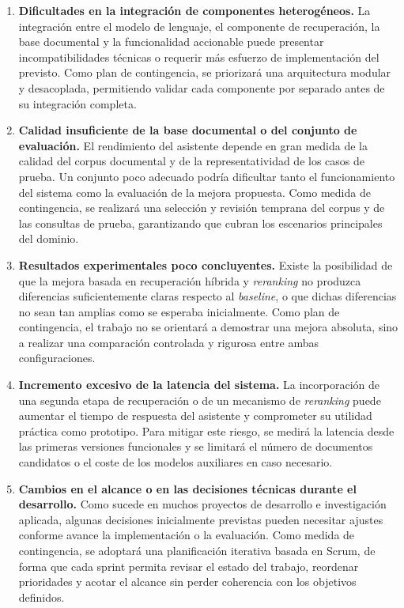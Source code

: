 \begin{enumerate}
    \item \textbf{Dificultades en la integración de componentes heterogéneos.}  
    La integración entre el modelo de lenguaje, el componente de recuperación, la base documental y la funcionalidad accionable puede presentar incompatibilidades técnicas o requerir más esfuerzo de implementación del previsto.  
    Como plan de contingencia, se priorizará una arquitectura modular y desacoplada, permitiendo validar cada componente por separado antes de su integración completa. 

    \item \textbf{Calidad insuficiente de la base documental o del conjunto de evaluación.}  
    El rendimiento del asistente depende en gran medida de la calidad del corpus documental y de la representatividad de los casos de prueba. Un conjunto poco adecuado podría dificultar tanto el funcionamiento del sistema como la evaluación de la mejora propuesta.  
    Como medida de contingencia, se realizará una selección y revisión temprana del corpus y de las consultas de prueba, garantizando que cubran los escenarios principales del dominio.

    \item \textbf{Resultados experimentales poco concluyentes.}  
    Existe la posibilidad de que la mejora basada en recuperación híbrida y \textit{reranking} no produzca diferencias suficientemente claras respecto al \textit{baseline}, o que dichas diferencias no sean tan amplias como se esperaba inicialmente.  
    Como plan de contingencia, el trabajo no se orientará a demostrar una mejora absoluta, sino a realizar una comparación controlada y rigurosa entre ambas configuraciones. 

    \item \textbf{Incremento excesivo de la latencia del sistema.}  
    La incorporación de una segunda etapa de recuperación o de un mecanismo de \textit{reranking} puede aumentar el tiempo de respuesta del asistente y comprometer su utilidad práctica como prototipo.  
    Para mitigar este riesgo, se medirá la latencia desde las primeras versiones funcionales y se limitará el número de documentos candidatos o el coste de los modelos auxiliares en caso necesario.

    \item \textbf{Cambios en el alcance o en las decisiones técnicas durante el desarrollo.}  
    Como sucede en muchos proyectos de desarrollo e investigación aplicada, algunas decisiones inicialmente previstas pueden necesitar ajustes conforme avance la implementación o la evaluación.  
    Como medida de contingencia, se adoptará una planificación iterativa basada en Scrum, de forma que cada sprint permita revisar el estado del trabajo, reordenar prioridades y acotar el alcance sin perder coherencia con los objetivos definidos.


\end{enumerate}
